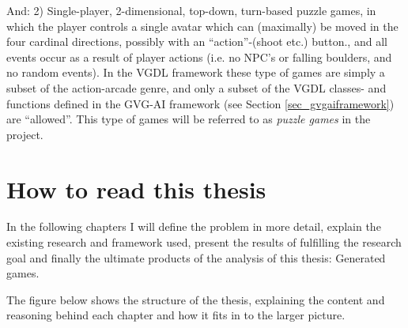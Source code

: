 \documentclass[a4paper,titlepage,final]{report}
\begin{document}
And: 2) Single-player, 2-dimensional, top-down, turn-based puzzle games, in which the player controls a single avatar which can (maximally) be moved in the four cardinal directions, possibly with an ``action''-(shoot etc.) button., and all events occur as a result of player actions (i.e. no NPC's or falling boulders, and no random events). 
In the VGDL framework these type of games are simply a subset of the action-arcade genre, and only a subset of the VGDL classes- and functions defined in the GVG-AI framework (see Section \ref{sec_gvgaiframework}) are ``allowed''.
This type of games will be referred to as \textit{puzzle games} in the project.


\section{How to read this thesis}
\label{sec_howtoread}
In the following chapters I will define the problem in more detail, explain the existing research and framework used, present the results of fulfilling the research goal and finally the ultimate products of the analysis of this thesis: Generated games.

The figure below shows the structure of the thesis, explaining the content and reasoning behind each chapter and how it fits in to the larger picture.
\end{document}
